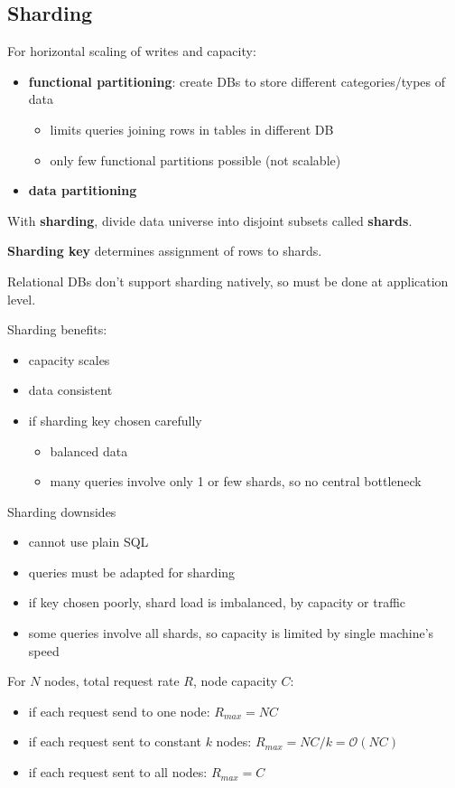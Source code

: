\documentclass[11pt]{article}
\begin{document}
\subsection{Sharding}
\label{sec:orgc4ac836}
For horizontal scaling of writes and capacity:
\begin{itemize}
\item \textbf{functional partitioning}: create DBs to store different categories/types of data
\begin{itemize}
\item limits queries joining rows in tables in different DB
\item only few functional partitions possible (not scalable)
\end{itemize}
\item \textbf{data partitioning}
\end{itemize}

With \textbf{sharding}, divide data universe into disjoint subsets called \textbf{shards}.

\textbf{Sharding key} determines assignment of rows to shards.

Relational DBs don't support sharding natively, so must be done at application level.

Sharding benefits:
\begin{itemize}
\item capacity scales
\item data consistent
\item if sharding key chosen carefully
\begin{itemize}
\item balanced data
\item many queries involve only 1 or
few shards, so no central
bottleneck
\end{itemize}
\end{itemize}

Sharding downsides
\begin{itemize}
\item cannot use plain SQL
\item queries must be adapted for sharding
\item if key chosen poorly, shard load is imbalanced,
by capacity or traffic
\item some queries involve all shards, so capacity
is limited by single machine's speed
\end{itemize}

For \(N\) nodes, total request rate \(R\), node capacity \(C\):
\begin{itemize}
\item if each request send to one node: \(R_{max} = NC\)
\item if each request sent to constant \(k\) nodes: \(R_{max} = NC/k = \mathcal{O}(NC)\)
\item if each request sent to all nodes: \(R_{max} = C\)
\end{itemize}
\end{document}
